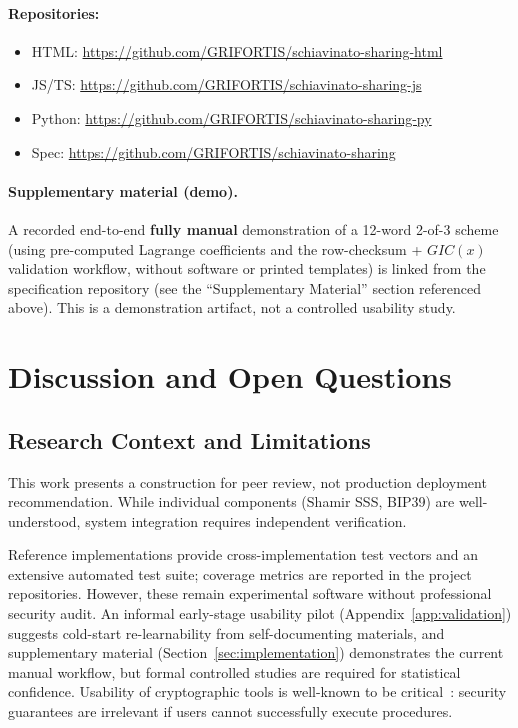 \documentclass[11pt]{article}
\begin{document}
\paragraph{Repositories:}
\begin{itemize}[noitemsep]
    \item HTML: \url{https://github.com/GRIFORTIS/schiavinato-sharing-html}
    \item JS/TS: \url{https://github.com/GRIFORTIS/schiavinato-sharing-js}
    \item Python: \url{https://github.com/GRIFORTIS/schiavinato-sharing-py}
    \item Spec: \url{https://github.com/GRIFORTIS/schiavinato-sharing}
\end{itemize}

\paragraph{Supplementary material (demo).} A recorded end-to-end \textbf{fully manual} demonstration of a 12-word 2-of-3 scheme (using pre-computed Lagrange coefficients and the row-checksum + $GIC(x)$ validation workflow, without software or printed templates) is linked from the specification repository (see the ``Supplementary Material'' section referenced above). This is a demonstration artifact, not a controlled usability study.

\section{Discussion and Open Questions}
\label{sec:discussion}

\subsection{Research Context and Limitations}

This work presents a construction for peer review, not production deployment recommendation. While individual components (Shamir SSS, BIP39) are well-understood, system integration requires independent verification.

Reference implementations provide cross-implementation test vectors and an extensive automated test suite; coverage metrics are reported in the project repositories. However, these remain experimental software without professional security audit. An informal early-stage usability pilot (Appendix~\ref{app:validation}) suggests cold-start re-learnability from self-documenting materials, and supplementary material (Section~\ref{sec:implementation}) demonstrates the current manual workflow, but formal controlled studies are required for statistical confidence. Usability of cryptographic tools is well-known to be critical~\cite{whitten1999}: security guarantees are irrelevant if users cannot successfully execute procedures.
\end{document}
